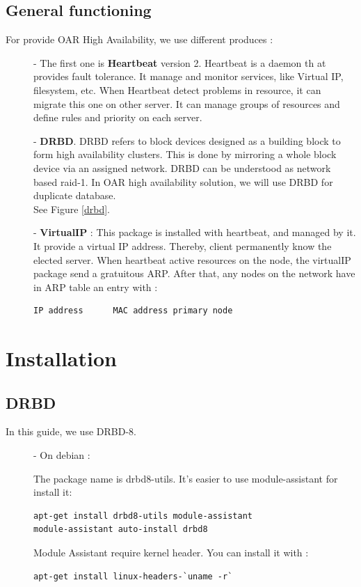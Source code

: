 \documentclass[a4paper,10pt]{report}
\begin{document}
\section{General functioning}
For provide OAR High Availability, we use different produces :
\begin{description}
\item[]- The first one is \textbf{Heartbeat} version 2. Heartbeat is a daemon th
at provides fault tolerance. It manage and monitor services, like Virtual IP, filesystem, etc. When Heartbeat detect problems in resource, it can migrate this one on other server. It can manage groups of resources and define rules and priority on each server.
\item[]- \textbf{DRBD}. DRBD refers to block devices designed as a building block to form high availability clusters. This is done by mirroring a whole block device via an assigned network. DRBD can be understood as network based raid-1. In OAR high availability solution, we will use DRBD for duplicate database.\\
See Figure \ref{drbd}.
\item[]- \textbf{VirtualIP} : This package is installed with heartbeat, and managed by it. It provide a virtual IP address. Thereby, client permanently know the elected server.
When heartbeat active resources on the node, the virtualIP package send a gratuitous ARP. After that, any nodes on the network have in ARP table an entry with :
\begin{lstlisting}
IP address		MAC address primary node
\end{lstlisting}

\end{description}













\chapter{Installation}
\section{DRBD}
In this guide, we use DRBD-8.
\begin{description}
\item[]- On debian :

The package name is drbd8-utils. It's easier to use module-assistant for install it:
\begin{lstlisting}
apt-get install drbd8-utils module-assistant
module-assistant auto-install drbd8
\end{lstlisting} 



Module Assistant require kernel header. You can install it with :
\begin{lstlisting}
apt-get install linux-headers-`uname -r`
\end{lstlisting}

\end{description}
\end{document}
